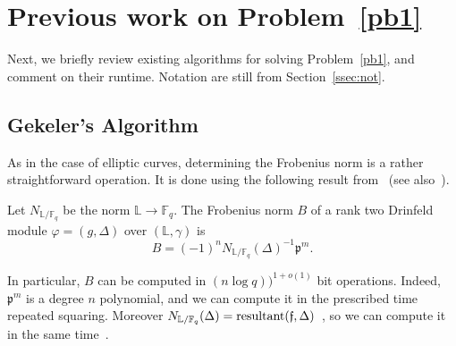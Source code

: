 \documentclass[sigconf]{acmart}
\newcommand{\F}{\mathbb{F}}
\renewcommand{\L}{\mathbb{L}}
\newcommand{\frakf}{\mathfrak{f}}
\newcommand{\frakp}{\mathfrak{p}}
\begin{document}

\section{Previous work on Problem~\ref{pb1}}

Next, we briefly review existing algorithms for solving
Problem~\ref{pb1}, and comment on their runtime. Notation are still
from Section~\ref{ssec:not}.


\subsection{Gekeler's Algorithm}\label{ssec:gek}

As in the case of elliptic curves, determining the Frobenius norm is a
rather straightforward operation. It is done using the following
result from~\cite[Th.~2.11]{frobdist} (see also~\cite{HsYu00}).

\begin{proposition}\label{frobnorm}
Let $N_{\L/\F_q}$ be the norm $\L \to \F_q$. The Frobenius norm $B$ of a rank two Drinfeld module $\varphi=(g,\Delta)$ 
  over $(\L,\gamma)$ is
  \[B = (-1)^n N_{\L/\F_q}(\Delta)^{-1}\frakp^m.\]
\end{proposition}
In particular, $B$ can be computed in $(n \log q))^{1+o(1)}$ bit
operations. Indeed, $\frakp^m$ is a degree $n$ polynomial, and we can
compute it in the prescribed time repeated squaring. Moreover
$N_{\L/\F_q}(\Delta) =
\textnormal{resultant}(\frakf,\Delta)$~\cite{Pohst:1989:AAN:76692},
so we can compute it in the same time~\cite{Gathen:2003:MCA:945759}.
\end{document}
